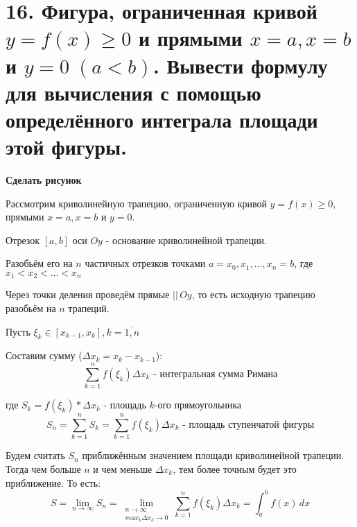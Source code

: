 \documentclass[11pt]{article}
\begin{document}
\section*{16. Фигура, ограниченная кривой $y = f(x) \geq 0$ и прямыми $x = a, x = b$ и $y = 0 \; (a < b)$. Вывести формулу для вычисления с помощью определённого интеграла площади этой фигуры.}
\par\textbf{Сделать рисунок}
\par Рассмотрим криволинейную трапецию, ограниченную кривой $y = f(x) \geq 0$, прямыми $x = a, x = b$  и $y = 0$.
\par Отрезок $[a, b]$ оси $Oy$ - основание криволинейной трапеции.
\par Разобьём его на $n$ частичных отрезков точками $a = x_{0}, x_{1}, \dots, x_{n} = b$, где $x_{1} < x_{2} < \dots < x_{n}$
\par Через точки деления проведём прямые $|| \, Oy$, то есть исходную трапецию разобьём на $n$ трапеций.
\par Пусть $\xi_{k} \in [x_{k-1}, x_{k}], k = \overline{1, n}$
\par Составим сумму ($\Delta x_{k} = x_{k} - x_{k - 1}$):
$$\sum_{k=1}^{n} f(\xi_{k}) \Delta x_{k} \text{ - интегральная сумма Римана}$$
\par где $S_{k} = f(\xi_{k}) * \Delta x_{k}$ - площадь $k$-ого прямоугольника
$$S_{n} = \sum_{k = 1}^{n} S_{k} = \sum_{k=1}^{n} f(\xi_{k}) \Delta x_{k} \text{ - площадь ступенчатой фигуры}$$
\par Будем считать $S_{n}$ приближённым значением площади криволинейной трапеции. Тогда чем больше $n$ и чем меньше $\Delta x_{k}$, тем более точным будет это приближение. То есть:$$S = \lim_{ n \to \infty } S_{n} = \lim_{ \substack{n \to \infty \\ max_{k} \Delta x_{k} \to 0} } \sum_{k = 1}^{n} f(\xi_{k}) \Delta x_{k} = \int_{a}^b f(x) \, dx$$
\end{document}
